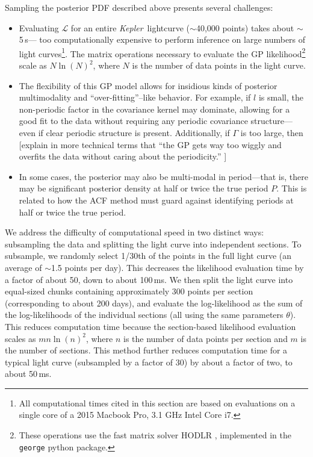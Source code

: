 \documentclass[useAMS, usenatbib, preprint, 12pt]{aastex}
\newcommand{\Kepler}{{\it Kepler}}
\begin{document}
Sampling the posterior PDF described above presents several challenges:
\begin{itemize}
\item Evaluating $\mathcal L$ for an entire \Kepler\ lightcurve
($\sim$40,000 points) takes about $\sim$5\,s--- too computationally expensive
to perform inference on large numbers of light curves\footnote{All
computational times cited in this section are based on evaluations on a
single core of a 2015 Macbook Pro, 3.1 GHz Intel Core i7.}.
The matrix operations necessary to evaluate the GP likelihood\footnote{These
operations use the fast matrix solver HODLR \citep{Ambikasaran2014},
implemented in the {\tt george} \citep{George} python package.} scale as
$N\ln(N)^2$, where $N$ is the number of data points in the light curve.

\item The flexibility of this GP model allows for insidious kinds of
posterior multimodality and ``over-fitting''--like behavior.  For example,
if $l$ is small,  the non-periodic factor in the covariance kernel may
dominate, allowing for a good fit to the data without requiring any
periodic covariance structure---even if
clear periodic structure is present.  Additionally, if $\Gamma$ is too large,
then [explain in more technical terms that ``the GP gets way too wiggly and
overfits the data without caring about the periodicity.'' ]

\item In some cases, the posterior may also be multi-modal in period---that is,
there may be significant posterior density at half or twice the true period $P$.
This is related to how the ACF method must guard against identifying periods
at half or twice the true period.
\end{itemize}

We address the difficulty of computational speed in two distinct ways: subsampling
the data and splitting the light curve into independent sections.
To subsample, we randomly select 1/30th of the points in the full light curve (an
average of $\sim$1.5 points per day).  This decreases the likelihood evaluation
time by a factor of about 50, down to about 100\,ms.
We then split the light curve into equal-sized
chunks containing approximately 300 points per section (corresponding to about
200 days), and evaluate the log-likelihood as the sum of the log-likelihoods
of the individual sections (all using the same parameters $\theta$).  This reduces
computation time because the section-based likelihood evaluation scales as $mn\ln(n)^2$, where $n$ is the number of data points per section and $m$ is the number of sections.
This method further reduces computation time for a typical light curve (subsampled
by a factor of 30) by about a factor of two, to about 50\,ms.
\end{document}

